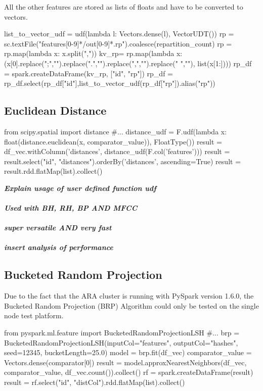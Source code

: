 All the other features are stored as lists of floats and have to be converted to vectors.  

\begin{pythonCode}
list_to_vector_udf = udf(lambda l: Vectors.dense(l), VectorUDT())
rp = sc.textFile("features[0-9]*/out[0-9]*.rp").coalesce(repartition_count)
rp = rp.map(lambda x: x.split(","))
kv_rp= rp.map(lambda x: (x[0].replace(";","").replace(".","").replace(",","").replace(" ",""), list(x[1:])))
rp_df = spark.createDataFrame(kv_rp, ["id", "rp"])
rp_df = rp_df.select(rp_df["id"],list_to_vector_udf(rp_df["rp"]).alias("rp"))
\end{pythonCode}

\subsection{Euclidean Distance}

\begin{pythonCode}
from scipy.spatial import distance
#...
distance_udf = F.udf(lambda x: float(distance.euclidean(x, comparator_value)), FloatType())
result = df_vec.withColumn('distances', distance_udf(F.col('features')))
result = result.select("id", "distances").orderBy('distances', ascending=True)
result = result.rdd.flatMap(list).collect()
\end{pythonCode}

\noindent\textit{\textbf{Explain usage of user defined function udf\\}}
\ \\
\noindent\textit{\textbf{Used with BH, RH, BP AND MFCC\\}}
\ \\
\noindent\textit{\textbf{super versatile AND very fast\\}}
\ \\
\noindent\textit{\textbf{insert analysis of performance\\}}

\subsection{Bucketed Random Projection}

Due to the fact that the ARA cluster is running with PySpark version 1.6.0, the Bucketed Random Projection (BRP) Algorithm could only be tested on the single node test platform. 

\begin{pythonCode}
from pyspark.ml.feature import BucketedRandomProjectionLSH
#...
brp = BucketedRandomProjectionLSH(inputCol="features", outputCol="hashes", seed=12345, bucketLength=25.0)
model = brp.fit(df_vec)
comparator_value = Vectors.dense(comparator[0])
result = model.approxNearestNeighbors(df_vec, comparator_value, df_vec.count()).collect()
rf = spark.createDataFrame(result)
result = rf.select("id", "distCol").rdd.flatMap(list).collect()
\end{pythonCode}

